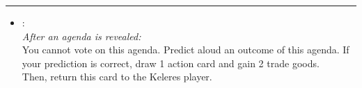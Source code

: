 \begin{multicols}{2}
\vspace{-10pt}\rule{\hsize}{0.4pt}\vspace{5pt}


\begin{itemize}
\item {}:\\
\emph{After an agenda is revealed:}\\
You cannot vote on this agenda. Predict aloud an outcome of this agenda. If your prediction is correct, draw 1 action card and gain 2 trade goods.\\
Then, return this card to the Keleres player.
\end{itemize}

\end{multicols}



